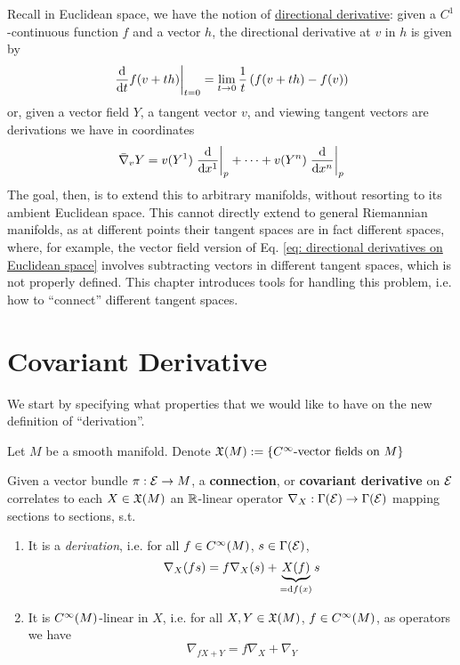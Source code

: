 \documentclass{article}
\begin{document}

\tableofcontents
\newpage

\textstart
Recall in Euclidean space, we have the notion of \underline{directional derivative}: given a $C^1$-continuous function $f$ and a vector $h$, the directional derivative at $v$ in $h$ is given by
\begin{equation}\label{eq: directional derivatives on Euclidean space}
    \left.\frac{\mathrm{d}}{\mathrm{d} t} f(v + th)\right|_{t = 0} = \lim_{t \to 0} \frac{1}{t} \left( f(v + th) - f(v) \right)
\end{equation}
or, given a vector field $Y$, a tangent vector $v$, and viewing tangent vectors are derivations we have in coordinates
\[
    \bar{\nabla}_v Y = v(Y^1) \left.\frac{\mathrm{d}}{\mathrm{d} x^1}\right|_{p} + \cdots + v(Y^n) \left.\frac{\mathrm{d}}{\mathrm{d} x^n}\right|_{p}
\]
The goal, then, is to extend this to arbitrary manifolds, without resorting to its ambient Euclidean space. This cannot directly extend to general Riemannian manifolds, as at different points their tangent spaces are in fact different spaces, where, for example, the vector field version of Eq. \eqref{eq: directional derivatives on Euclidean space} involves subtracting vectors in different tangent spaces, which is not properly defined. This chapter introduces tools for handling this problem, i.e. how to ``connect'' different tangent spaces.

\section{Covariant Derivative}

\textstart
We start by specifying what properties that we would like to have on the new definition of ``derivation''.

\begin{notation}
    Let $M$ be a smooth manifold. Denote $\mathfrak{X}(M) := \{ C^{\infty} \text{-vector fields on }M \}$
\end{notation}
\nogap
\begin{definition}
    Given a vector bundle $\pi: \mathcal{E} \to M$, a \textbf{connection}, or \textbf{covariant derivative} on $\mathcal{E}$ correlates to each $X \in \mathfrak{X}(M)$ an $\mathbb{R}$-linear operator $\nabla_X : \Gamma(\mathcal{E}) \to \Gamma(\mathcal{E})$ mapping sections to sections, s.t.
    \begin{enumerate}[label=\arabic*)]
        \item It is a \emph{derivation}, i.e. for all $f \in C^{\infty}(M)$, $s \in \Gamma(\mathcal{E})$, 
        \[
            \nabla_X (fs) = f \nabla_X (s) + \underbrace{X(f)}_{=\mathrm{d} f(x)} s
        \]
        \item It is $C^{\infty}(M)$-linear in $X$, i.e. for all $X, Y \in \mathfrak{X}(M)$, $f \in C^{\infty}(M)$, as operators we have
        \[
            \nabla_{fX + Y} = f \nabla_X + \nabla_Y
        \]
    \end{enumerate}
\end{definition}
\end{document}
